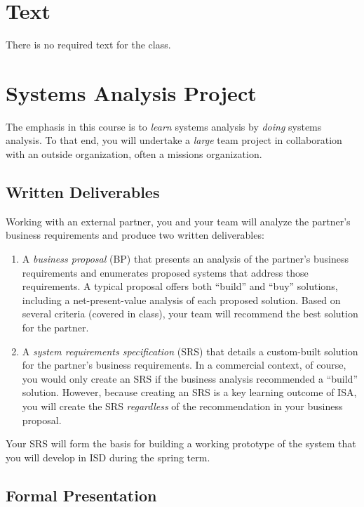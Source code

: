 \documentclass[11pt]{article}
\begin{document}
\section{Text}

There is no required text for the class.

\section{Systems Analysis Project}

The emphasis in this course is to \emph{learn} systems analysis
by \emph{doing} systems analysis.
To that end,
you will undertake a \emph{large} team project
in collaboration with an outside organization,
often a missions organization.

\subsection{Written Deliverables}

Working with an external partner,
you and your team
will analyze the partner's business requirements
and produce two written deliverables:
\begin{enumerate}
\item A \emph{business proposal} (BP) that presents an analysis
  of the partner's business requirements
  and enumerates proposed systems
  that address those requirements.
  A typical proposal
  offers both ``build'' and ``buy'' solutions,
  including a net-present-value analysis of each proposed solution.
  Based on several criteria (covered in class),
  your team will recommend the best solution for the partner.
\item A \emph{system requirements specification} (SRS)
  that details a custom-built solution for the partner's business requirements.
  In a commercial context, of course,
  you would only create an SRS
  if the business analysis recommended a ``build'' solution.
  However, because creating an SRS is a key learning outcome of ISA,
  you will create the SRS \emph{regardless} of the recommendation in your business proposal.
\end{enumerate}
Your SRS will form the basis for building a working prototype of the system
that you will develop in ISD during the spring term.

\subsection{Formal Presentation}
\end{document}
